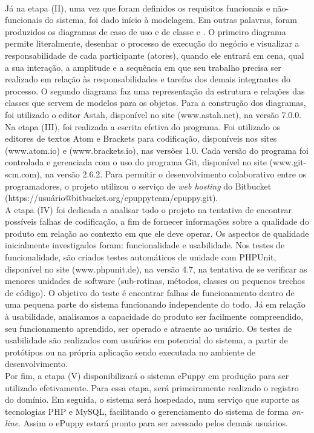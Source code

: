 \\
\indent
Já na etapa (II), uma vez que foram definidos os requisitos funcionais e não-funcionais do sistema, foi dado início à modelagem. Em outras palavras, foram produzidos os diagramas de caso de uso e de classe \cite{Fowler2005} e \cite{Bezerra2002}. O primeiro diagrama permite literalmente, desenhar o processo de execução do negócio e visualizar a responsabilidade de cada participante (atores), quando ele entrará em cena, qual a sua interação, a amplitude e a sequência em que seu trabalho precisa ser realizado em relação às responsabilidades e tarefas dos demais integrantes do processo. O segundo diagrama faz uma representação da estrutura e relações das classes que servem de modelos para os objetos. Para a construção dos diagramas, foi utilizado o editor Astah, disponível no site (www.astah.net), na versão 7.0.0.
\\
\indent
Na etapa (III), foi realizada a escrita efetiva do programa. Foi utilizado os editores de textos Atom e Brackets para codificação, disponíveis nos sites (www.atom.io) e (www.brackets.io), nas versões 1.0. Cada versão do programa foi controlada e gerenciada com o uso do programa Git, disponível no site (www.git-scm.com), na versão 2.6.2. Para permitir o desenvolvimento colaborativo entre os programadores, o projeto utilizou o serviço de {\it web hosting} do Bitbucket (https://usuário@bitbucket.org/epuppyteam/epuppy.git).
\\
\indent
A etapa (IV) foi dedicada a analisar todo o projeto na tentativa de encontrar possíveis falhas de codificação, a fim de fornecer informações sobre a qualidade do produto em relação ao contexto em que ele deve operar. Os aspectos de qualidade inicialmente investigados foram: funcionalidade e usabilidade. Nos testes de funcionalidade, são criados testes automáticos de unidade com PHPUnit, disponível no site (www.phpunit.de), na versão 4.7, na tentativa de se verificar as menores unidades de software (sub-rotinas, métodos, classes ou pequenos trechos de código). O objetivo do teste é encontrar falhas de funcionamento dentro de uma pequena parte do sistema funcionando independente do todo. Já em relação à usabilidade, analisamos a capacidade do produto ser facilmente compreendido, seu funcionamento aprendido, ser operado e atraente ao usuário. Os testes de usabilidade são realizados com usuários em potencial do sistema, a partir de protótipos ou na própria aplicação sendo executada no ambiente de desenvolvimento.
\\
\indent
Por fim, a etapa (V) disponibilizará o sistema ePuppy em produção para ser utilizado efetivamente. Para essa etapa, será primeiramente realizado o registro do domínio. Em seguida, o sistema será hospedado, num serviço que suporte as tecnologias PHP e MySQL, facilitando o gerenciamento do sistema de forma {\it on-line}. Assim o ePuppy estará pronto para ser acessado pelos demais usuários.

